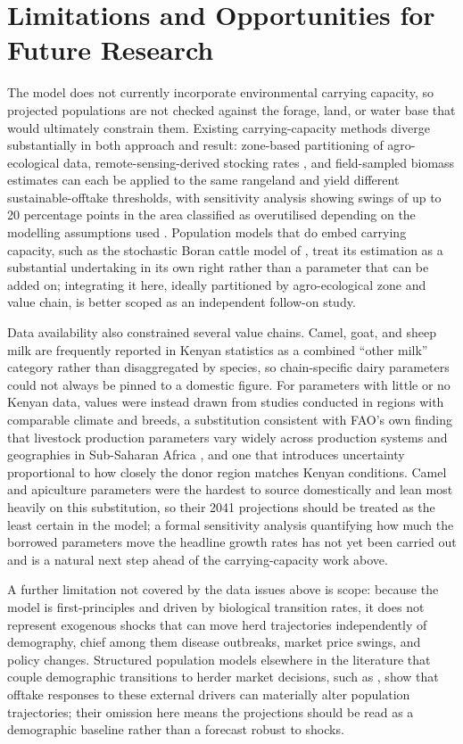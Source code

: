 \section{Limitations and Opportunities for Future Research}

The model does not currently incorporate environmental carrying capacity, so projected populations are not checked against the forage, land, or water base that would ultimately constrain them. Existing carrying-capacity methods diverge substantially in both approach and result: zone-based partitioning of agro-ecological data, remote-sensing-derived stocking rates \citep{meshesha2019}, and field-sampled biomass estimates can each be applied to the same rangeland and yield different sustainable-offtake thresholds, with sensitivity analysis showing swings of up to 20 percentage points in the area classified as overutilised depending on the modelling assumptions used \citep{zandler2023}. Population models that do embed carrying capacity, such as the stochastic Boran cattle model of \citet{tuffa2017}, treat its estimation as a substantial undertaking in its own right rather than a parameter that can be added on; integrating it here, ideally partitioned by agro-ecological zone and value chain, is better scoped as an independent follow-on study.

Data availability also constrained several value chains. Camel, goat, and sheep milk are frequently reported in Kenyan statistics as a combined ``other milk'' category rather than disaggregated by species, so chain-specific dairy parameters could not always be pinned to a domestic figure. For parameters with little or no Kenyan data, values were instead drawn from studies conducted in regions with comparable climate and breeds, a substitution consistent with FAO's own finding that livestock production parameters vary widely across production systems and geographies in Sub-Saharan Africa \citep{otte2002}, and one that introduces uncertainty proportional to how closely the donor region matches Kenyan conditions. Camel and apiculture parameters were the hardest to source domestically and lean most heavily on this substitution, so their 2041 projections should be treated as the least certain in the model; a formal sensitivity analysis quantifying how much the borrowed parameters move the headline growth rates has not yet been carried out and is a natural next step ahead of the carrying-capacity work above.

A further limitation not covered by the data issues above is scope: because the model is first-principles and driven by biological transition rates, it does not represent exogenous shocks that can move herd trajectories independently of demography, chief among them disease outbreaks, market price swings, and policy changes. Structured population models elsewhere in the literature that couple demographic transitions to herder market decisions, such as \citet{tuffa2017}, show that offtake responses to these external drivers can materially alter population trajectories; their omission here means the projections should be read as a demographic baseline rather than a forecast robust to shocks.

